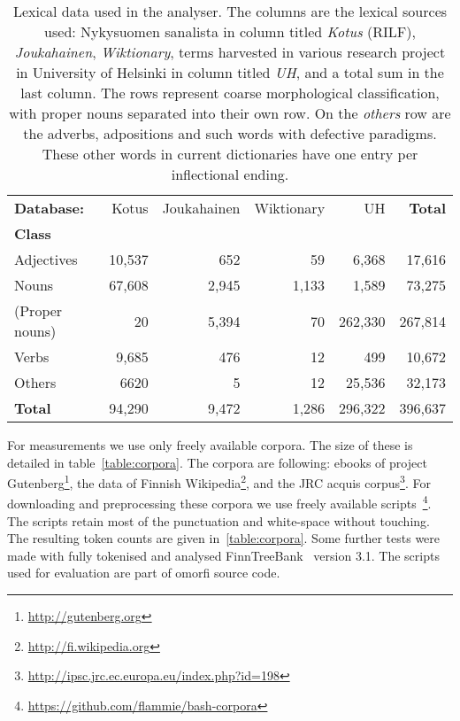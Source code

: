 \documentclass[a4paper,12pt]{article}
\begin{document}
\begin{table}
    \begin{scriptsize}
  \centering
    \begin{tabular}{|l|r|r|r|r||r|}
        \hline
        \bf Database: & Kotus & Joukahainen & Wiktionary & UH & \bf Total \\
        \bf Class   & & & & & \\
        \hline
        Adjectives     & 10,537 & 652   & 59    & 6,368   & 17,616  \\
        Nouns          & 67,608 & 2,945 & 1,133 & 1,589   & 73,275  \\
        (Proper nouns) & 20     & 5,394 & 70    & 262,330 & 267,814 \\
        Verbs          & 9,685  & 476   & 12    & 499     & 10,672  \\
        Others         & 6620   & 5     & 12    & 25,536  & 32,173  \\
        \hline
        \bf Total      & 94,290 & 9,472 & 1,286 & 296,322 & 396,637 \\
        \hline
    \end{tabular}
  \caption{Lexical data used in the analyser.  The columns are the lexical
      sources used: Nykysuomen sanalista in column titled \emph{Kotus} (RILF),
      \emph{Joukahainen}, \emph{Wiktionary}, terms harvested in various
      research project in University of Helsinki in column titled \emph{UH},
      and a total sum in the last column. The rows represent coarse
      morphological classification, with proper nouns separated into their own
      row. On the \emph{others} row are the adverbs, adpositions and such words
      with defective paradigms. These other words in current dictionaries have one
      entry per inflectional ending.
  \label{table:lexical}}
  \end{scriptsize}
\end{table}


For measurements we use only freely available corpora. The size of these is
detailed in table~\ref{table:corpora}. The corpora are following: ebooks of project
Gutenberg\footnote{\url{http://gutenberg.org}}, the data of Finnish
Wikipedia\footnote{\url{http://fi.wikipedia.org}}, and the JRC acquis
corpus\footnote{\url{http://ipsc.jrc.ec.europa.eu/index.php?id=198}}. For
downloading and preprocessing these corpora we use freely available
scripts~\footnote{\url{https://github.com/flammie/bash-corpora}}. The scripts
retain most of the punctuation and white-space without touching. The resulting
token counts are given in~\ref{table:corpora}. Some further tests were made
with fully tokenised and analysed
FinnTreeBank~\citep{voutilainen2012specifying} version 3.1.  The scripts used
for evaluation are part of omorfi source code.
\end{document}
